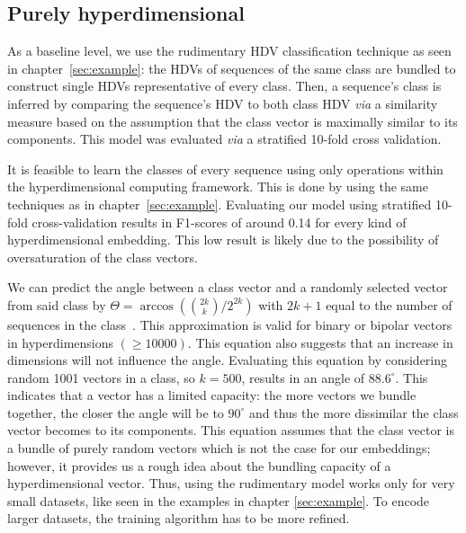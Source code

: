 \subsection*{Purely hyperdimensional}
As a baseline level, we use the rudimentary HDV classification technique as seen in chapter~\ref{sec:example}: the HDVs of sequences of the same class are bundled to construct single HDVs representative of every class. Then, a sequence's class is inferred by comparing the sequence's HDV to both class HDV \textit{via} a similarity measure based on the assumption that the class vector is maximally similar to its components. This model was evaluated \textit{via} a stratified 10-fold cross validation.
\begin{table}[h]
    \caption{\label{tab:phalpclass}Results of type classifications using the principal classification technique of hyperdimensional computing and an XGBoost classifier with several kinds of embeddings}
\end{table}

It is feasible to learn the classes of every sequence using only operations within the hyperdimensional computing framework. This is done by using the same techniques as in chapter~\ref{sec:example}. Evaluating our model using stratified 10-fold cross-validation results in F1-scores of around 0.14 for every kind of hyperdimensional embedding. This low result is likely due to the possibility of oversaturation of the class vectors.

We can predict the angle between a class vector and a randomly selected vector from said class by $\Theta = \arccos({2k \choose k}/2^{2k})$ with $2k+1$ equal to the number of sequences in the class~\cite{sathdv}. This approximation is valid for binary or bipolar vectors in hyperdimensions $(\ge 10000)$. This equation also suggests that an increase in dimensions will not influence the angle. Evaluating this equation by considering random 1001 vectors in a class, so $k = 500$, results in an angle of $88.6^{\circ}$. This indicates that a vector has a limited capacity: the more vectors we bundle together, the closer the angle will be to $90^{\circ}$ and thus the more dissimilar the class vector becomes to its components. This equation assumes that the class vector is a bundle of purely random vectors which is not the case for our embeddings; however, it provides us a rough idea about the bundling capacity of a hyperdimensional vector. Thus, using the rudimentary model works only for very small datasets, like seen in the examples in chapter \ref{sec:example}. To encode larger datasets, the training algorithm has to be more refined.

